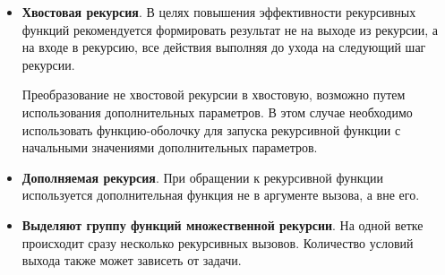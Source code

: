 \documentclass[a4paper,oneside,12pt]{extreport}
\begin{document}
\begin{itemize}
	\item {\bfseries Хвостовая рекурсия}.
	В целях повышения эффективности рекурсивных функций рекомендуется формировать результат не на выходе из рекурсии, а на входе в рекурсию, все действия выполняя до ухода на следующий шаг рекурсии.

	Преобразование не хвостовой рекурсии в хвостовую, возможно путем использования дополнительных параметров.
	В этом случае необходимо использовать функцию-оболочку для запуска рекурсивной функции с начальными значениями дополнительных параметров.

	\item {\bfseries Дополняемая рекурсия}.
	При обращении к рекурсивной функции используется дополнительная функция не в аргументе вызова, а вне его.

	\item {\bfseries Выделяют группу функций множественной рекурсии}.
	На одной ветке происходит сразу несколько рекурсивных вызовов.
	Количество условий выхода также может зависеть от задачи.
\end{itemize}
\end{document}
